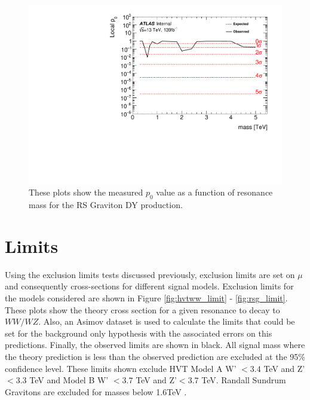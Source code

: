 \begin{figure}[h!]
  \centering
  \includegraphics[width=\hsize]{figures/results/pvalues/fixed_pvalues/rsg_pvalue.pdf}
 \caption{These plots show the measured $p_{0}$ value as a function of resonance mass for the RS Graviton DY production.} 
  \label{fig:discov_rsg}
\end{figure} 
\FloatBarrier


\section{Limits}
Using the exclusion limits tests discussed previously, exclusion limits are set on $\mu$ and consequently cross-sections for different signal models. Exclusion limits for the models considered are shown in Figure \ref{fig:hvtww_limit} - \ref{fig:rsg_limit}. These plots show the theory cross section for a given resonance to decay to $WW/WZ$. Also, an Asimov dataset is used to calculate the limits that could be set for the background only hypothesis with the associated errors on this predictions. Finally, the observed limits are shown in black. All signal mass where the theory prediction is less than the observed prediction are excluded at the 95\% confidence level. These limits shown exclude HVT Model A W' $< 3.4$ TeV and Z' $< 3.3$ TeV and Model B W' $< 3.7$ TeV and Z'$ < 3.7$ TeV. Randall Sundrum Gravitons are excluded for masses below 1.6TeV .



